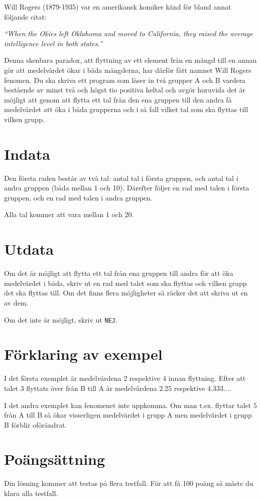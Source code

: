 Will Rogers (1879-1935) var en amerikansk komiker känd för bland annat följande citat:

\emph{``When the Okies left Oklahoma and moved to California, they raised the average intelligence level in both states.''}

Denna skenbara paradox, att flyttning av ett element från en mängd till en annan gör att medelvärdet ökar i båda mängderna, har därför fått namnet Will Rogers fenomen.
Du ska skriva ett program som läser in två grupper A och B vardera bestående av minst två och högst tio positiva heltal och avgör huruvida det är möjligt att genom att flytta ett tal från den ena gruppen till den andra få medelvärdet att öka i båda grupperna och i så fall vilket tal som ska flyttas till vilken grupp.

\section*{Indata}
Den första raden består av två tal: antal tal i första gruppen, och antal tal i andra gruppen (båda mellan 1 och 10).
Därefter följer en rad med talen i första gruppen, och en rad med talen i andra gruppen.

Alla tal kommer att vara mellan $1$ och $20$.

\section*{Utdata}
Om det är möjligt att flytta ett tal från ena gruppen till andra för att öka medelvärdet i båda,
skriv ut en rad med talet som ska flyttas och vilken grupp det ska flyttas till.
Om det finns flera möjligheter så räcker det att skriva ut en av dem.

Om det inte är möjligt, skriv ut \texttt{NEJ}.

\section*{Förklaring av exempel}
I det första exemplet är medelvärdena $2$ respektive $4$ innan flyttning.
Efter att talet $3$ flyttats över från B till A är medelvärdena $2.25$ respektive $4.333\ldots$.

I det andra exemplet kan fenomenet inte uppkomma.
Om man t.ex. flyttar talet $5$ från A till B så ökar visserligen medelvärdet i grupp A men medelvärdet i grupp B förblir oförändrat.

\section*{Poängsättning}
Din lösning kommer att testas på flera testfall. För att få 100 poäng så måste du klara alla testfall.
